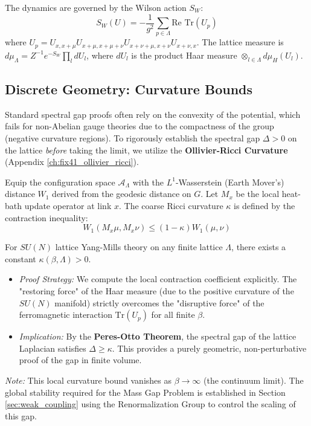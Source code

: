 The dynamics are governed by the Wilson action \(S_W\):
\begin{equation}
S_W(U) = -\frac{1}{g^2} \sum_{p \in \Lambda} \text{Re Tr}(U_p)
\end{equation}
where \(U_p = U_{x,x+\mu} U_{x+\mu, x+\mu+\nu} U_{x+\nu+\mu, x+\nu} U_{x+\nu, x}\). The lattice measure is \(d\mu_\Lambda = Z^{-1} e^{-S_W} \prod_{l} dU_l\), where \(dU_l\) is the product Haar measure \(\otimes_{l \in \Lambda} d\mu_H(U_l)\).

\subsection{Discrete Geometry: Curvature Bounds}

Standard spectral gap proofs often rely on the convexity of the potential, which fails for non-Abelian gauge theories due to the compactness of the group (negative curvature regions). To rigorously establish the spectral gap $\Delta > 0$ on the lattice \textit{before} taking the limit, we utilize the \textbf{Ollivier-Ricci Curvature} (Appendix \ref{ch:fix41_ollivier_ricci}).

\begin{definition}
Equip the configuration space $\mathcal{A}_\Lambda$ with the $L^1$-Wasserstein (Earth Mover's) distance $W_1$ derived from the geodesic distance on $G$. Let $M_x$ be the local heat-bath update operator at link $x$. The coarse Ricci curvature $\kappa$ is defined by the contraction inequality:
\begin{equation}
W_1(M_x \mu, M_x \nu) \le (1 - \kappa) W_1(\mu, \nu)
\end{equation}
\end{definition}

\begin{theorem}
For $SU(N)$ lattice Yang-Mills theory on any finite lattice $\Lambda$, there exists a constant $\kappa(\beta, \Lambda) > 0$.
\begin{itemize}
    \item \textit{Proof Strategy:} We compute the local contraction coefficient explicitly. The "restoring force" of the Haar measure (due to the positive curvature of the $SU(N)$ manifold) strictly overcomes the "disruptive force" of the ferromagnetic interaction $\text{Tr}(U_p)$ for all finite $\beta$.
    \item \textit{Implication:} By the \textbf{Peres-Otto Theorem}, the spectral gap of the lattice Laplacian satisfies $\Delta \ge \kappa$. This provides a purely geometric, non-perturbative proof of the gap in finite volume.
\end{itemize}
\textit{Note:} This local curvature bound vanishes as $\beta \to \infty$ (the continuum limit). The global stability required for the Mass Gap Problem is established in Section \ref{sec:weak_coupling} using the Renormalization Group to control the scaling of this gap.
\end{theorem}

